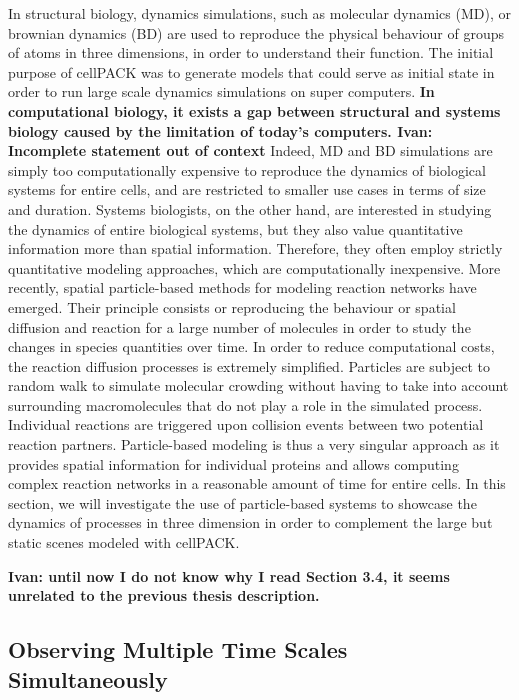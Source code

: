 In structural biology, dynamics simulations, such as molecular dynamics (MD), or brownian dynamics (BD) are used to reproduce the physical behaviour of groups of atoms in three dimensions, in order to understand their function.
The initial purpose of cellPACK was to generate models that could serve as initial state in order to run large scale dynamics simulations on super computers.
\textbf{In computational biology, it exists a gap between structural and systems biology caused by the limitation of today's computers. Ivan: Incomplete statement out of context}
Indeed, MD and BD simulations are simply too computationally expensive to reproduce the dynamics of biological systems for entire cells, and are restricted to smaller use cases in terms of size and duration.
Systems biologists, on the other hand, are interested in studying the dynamics of entire biological systems, but they also value quantitative information more than spatial information.
Therefore, they often employ strictly quantitative modeling approaches, which are computationally inexpensive.
More recently, spatial particle-based methods for modeling reaction networks have emerged.
Their principle consists or reproducing the behaviour or spatial diffusion and reaction for a large number of molecules in order to study the changes in species quantities over time.
In order to reduce computational costs, the reaction diffusion processes is extremely simplified.
Particles are subject to random walk to simulate molecular crowding without having to take into account surrounding macromolecules that do not play a role in the simulated process.
Individual reactions are triggered upon collision events between two potential reaction partners.
Particle-based modeling is thus a very singular approach as it provides spatial information for individual proteins and allows computing complex reaction networks in a reasonable amount of time for entire cells.
In this section, we will investigate the use of particle-based systems to showcase the dynamics of processes in three dimension in order to complement the large but static scenes modeled with cellPACK. 

\textbf{Ivan: until now I do not know why I read Section 3.4, it seems unrelated to the previous thesis description.}

\subsection{Observing Multiple Time Scales Simultaneously}

